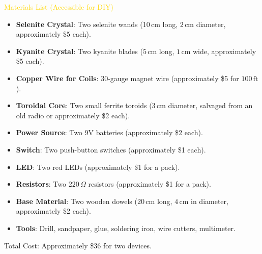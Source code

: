 \textcolor{gold}{ Materials List (Accessible for DIY) }
\begin{itemize}
    \item \texttt{} \textbf{Selenite Crystal}: Two selenite wands (10\,cm long, $2\,\mathrm{cm}$ diameter, approximately \$5 each).
    \item \texttt{} \textbf{Kyanite Crystal}: Two kyanite blades ($5\,\mathrm{cm}$ long, $1\,\mathrm{cm}$ wide, approximately \$5 each).
    \item \texttt{} \textbf{Copper Wire for Coils}: 30-gauge magnet wire (approximately \$5 for $100\,\mathrm{ft}$).
    \item \texttt{} \textbf{Toroidal Core}: Two small ferrite toroids ($3\,\mathrm{cm}$ diameter, salvaged from an old radio or approximately \$2 each).
    \item \texttt{} \textbf{Power Source}: Two 9V batteries (approximately \$2 each).
    \item \texttt{} \textbf{Switch}: Two push-button switches (approximately \$1 each).
    \item \texttt{} \textbf{LED}: Two red LEDs (approximately \$1 for a pack).
    \item \texttt{} \textbf{Resistors}: Two $220\,\Omega$ resistors (approximately \$1 for a pack).
    \item \texttt{} \textbf{Base Material}: Two wooden dowels ($20\,\mathrm{cm}$ long, $4\,\mathrm{cm}$ in diameter, approximately \$2 each).
    \item \texttt{} \textbf{Tools}: Drill, sandpaper, glue, soldering iron, wire cutters, multimeter.
\end{itemize}
Total Cost: Approximately \$36 for two devices.

